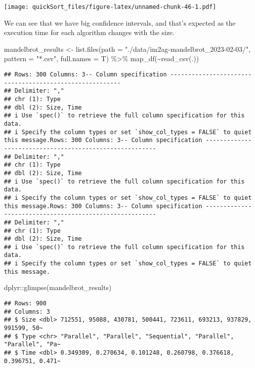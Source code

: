 \documentclass[
]{article}
\newenvironment{Shaded}{\begin{snugshade}}{\end{snugshade}}
\newcommand{\AttributeTok}[1]{\textcolor[rgb]{0.77,0.63,0.00}{#1}}
\newcommand{\FunctionTok}[1]{\textcolor[rgb]{0.00,0.00,0.00}{#1}}
\newcommand{\NormalTok}[1]{#1}
\newcommand{\OtherTok}[1]{\textcolor[rgb]{0.56,0.35,0.01}{#1}}
\newcommand{\SpecialCharTok}[1]{\textcolor[rgb]{0.00,0.00,0.00}{#1}}
\newcommand{\StringTok}[1]{\textcolor[rgb]{0.31,0.60,0.02}{#1}}
\begin{document}
\texttt{[image: quickSort\_files/figure-latex/unnamed-chunk-46-1.pdf]}

We can see that we have big confidence intervals, and that's expected as
the execution time for each algorithm changes with the size.

\begin{Shaded}
\begin{Highlighting}[]
\NormalTok{mandelbrot\_results }\OtherTok{\textless{}{-}} \FunctionTok{list.files}\NormalTok{(}\AttributeTok{path =} \StringTok{"./data/im2ag{-}mandelbrot\_2023{-}02{-}03/"}\NormalTok{, }\AttributeTok{pattern =} \StringTok{"*.csv"}\NormalTok{, }\AttributeTok{full.names =}\NormalTok{ T) }\SpecialCharTok{\%\textgreater{}\%} \FunctionTok{map\_df}\NormalTok{(}\SpecialCharTok{\textasciitilde{}}\FunctionTok{read\_csv}\NormalTok{(.)) }
\end{Highlighting}
\end{Shaded}

\begin{verbatim}
## Rows: 300 Columns: 3-- Column specification --------------------------------------------------------
## Delimiter: ","
## chr (1): Type
## dbl (2): Size, Time
## i Use `spec()` to retrieve the full column specification for this data.
## i Specify the column types or set `show_col_types = FALSE` to quiet this message.Rows: 300 Columns: 3-- Column specification --------------------------------------------------------
## Delimiter: ","
## chr (1): Type
## dbl (2): Size, Time
## i Use `spec()` to retrieve the full column specification for this data.
## i Specify the column types or set `show_col_types = FALSE` to quiet this message.Rows: 300 Columns: 3-- Column specification --------------------------------------------------------
## Delimiter: ","
## chr (1): Type
## dbl (2): Size, Time
## i Use `spec()` to retrieve the full column specification for this data.
## i Specify the column types or set `show_col_types = FALSE` to quiet this message.
\end{verbatim}

\begin{Shaded}
\begin{Highlighting}[]
\NormalTok{dplyr}\SpecialCharTok{::}\FunctionTok{glimpse}\NormalTok{(mandelbrot\_results)}
\end{Highlighting}
\end{Shaded}

\begin{verbatim}
## Rows: 900
## Columns: 3
## $ Size <dbl> 712551, 95088, 430781, 500441, 723611, 693213, 937829, 991599, 50~
## $ Type <chr> "Parallel", "Parallel", "Sequential", "Parallel", "Parallel", "Pa~
## $ Time <dbl> 0.349309, 0.270634, 0.101248, 0.260798, 0.376618, 0.396751, 0.471~
\end{verbatim}
\end{document}
